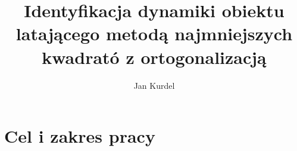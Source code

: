 \documentclass{article}
\begin{document}
\title{Identyfikacja dynamiki obiektu latającego metodą najmniejszych kwadrató z ortogonalizacją}
\author{Jan Kurdel}
\maketitle

\newpage

\section{Cel i zakres pracy}
\end{document}
